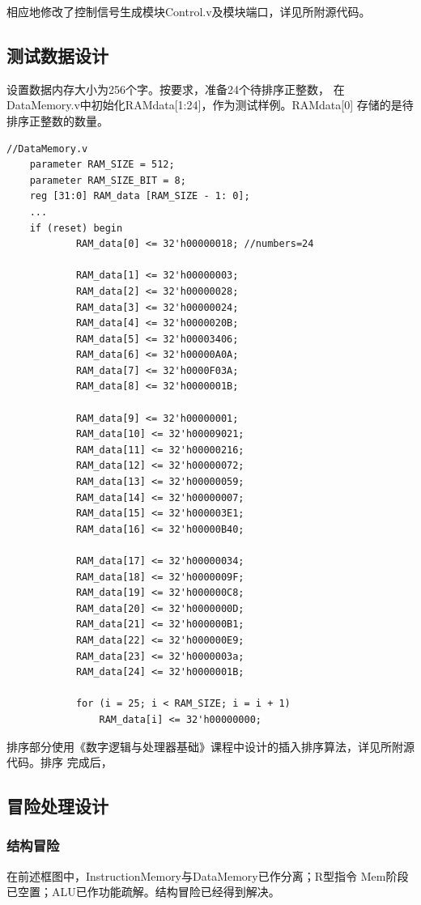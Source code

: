 \documentclass[10pt]{article}
\begin{document}
相应地修改了控制信号生成模块Control.v及模块端口，详见所附源代码。

\subsection{测试数据设计}
设置数据内存大小为256个字。按要求，准备24个待排序正整数，
在DataMemory.v中初始化RAMdata[1:24]，作为测试样例。RAMdata[0]
存储的是待排序正整数的数量。

\begin{lstlisting}[style={verilog-style}]
    //DataMemory.v
    parameter RAM_SIZE = 512;
    parameter RAM_SIZE_BIT = 8;
    reg [31:0] RAM_data [RAM_SIZE - 1: 0];
    ...
    if (reset) begin
            RAM_data[0] <= 32'h00000018; //numbers=24
            
            RAM_data[1] <= 32'h00000003; 
            RAM_data[2] <= 32'h00000028; 
            RAM_data[3] <= 32'h00000024; 
            RAM_data[4] <= 32'h0000020B; 
            RAM_data[5] <= 32'h00003406; 
            RAM_data[6] <= 32'h00000A0A; 
            RAM_data[7] <= 32'h0000F03A; 
            RAM_data[8] <= 32'h0000001B; 
            
            RAM_data[9] <= 32'h00000001; 
            RAM_data[10] <= 32'h00009021; 
            RAM_data[11] <= 32'h00000216; 
            RAM_data[12] <= 32'h00000072; 
            RAM_data[13] <= 32'h00000059; 
            RAM_data[14] <= 32'h00000007; 
            RAM_data[15] <= 32'h000003E1; 
            RAM_data[16] <= 32'h00000B40; 
            
            RAM_data[17] <= 32'h00000034; 
            RAM_data[18] <= 32'h0000009F; 
            RAM_data[19] <= 32'h000000C8;
            RAM_data[20] <= 32'h0000000D; 
            RAM_data[21] <= 32'h000000B1; 
            RAM_data[22] <= 32'h000000E9; 
            RAM_data[23] <= 32'h0000003a; 
            RAM_data[24] <= 32'h0000001B; 
        
            for (i = 25; i < RAM_SIZE; i = i + 1)
                RAM_data[i] <= 32'h00000000;
\end{lstlisting}

排序部分使用《数字逻辑与处理器基础》课程中设计的插入排序算法，详见所附源代码。排序
完成后，

\subsection{冒险处理设计}
\subsubsection{结构冒险}
在前述框图中，InstructionMemory与DataMemory已作分离；R型指令
Mem阶段已空置；ALU已作功能疏解。结构冒险已经得到解决。
\end{document}
